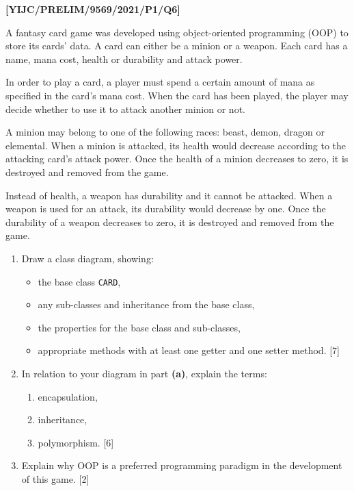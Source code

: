 \item \textbf{{[}YIJC/PRELIM/9569/2021/P1/Q6{]} }

A fantasy card game was developed using object-oriented programming
(OOP) to store its cards\textquoteright{} data. A card can either
be a minion or a weapon. Each card has a name, mana cost, health or
durability and attack power. 

In order to play a card, a player must spend a certain amount of mana
as specified in the card\textquoteright s mana cost. When the card
has been played, the player may decide whether to use it to attack
another minion or not. 

A minion may belong to one of the following races: beast, demon, dragon
or elemental. When a minion is attacked, its health would decrease
according to the attacking card\textquoteright s attack power. Once
the health of a minion decreases to zero, it is destroyed and removed
from the game. 

Instead of health, a weapon has durability and it cannot be attacked.
When a weapon is used for an attack, its durability would decrease
by one. Once the durability of a weapon decreases to zero, it is destroyed
and removed from the game. 
\begin{enumerate}
\item Draw a class diagram, showing: 
\begin{itemize}
\item the base class \texttt{CARD}, 
\item any sub-classes and inheritance from the base class, 
\item the properties for the base class and sub-classes, 
\item appropriate methods with at least one getter and one setter method.\hfill{}
{[}7{]}
\end{itemize}
\item In relation to your diagram in part \textbf{(a)}, explain the terms: 
\begin{enumerate}
\item encapsulation, 
\item inheritance, 
\item polymorphism. \hfill{}{[}6{]}
\end{enumerate}
\item Explain why OOP is a preferred programming paradigm in the development
of this game. \hfill{}{[}2{]}
\end{enumerate}